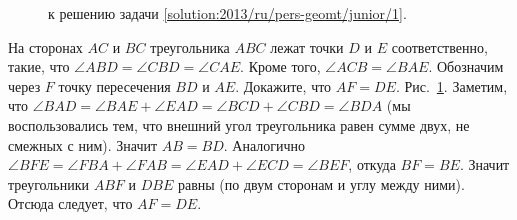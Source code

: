\ifsolution
\begin{figure}\centering
    \caption{к решению задачи \ref{solution:2013/ru/pers-geomt/junior/1}.}
    \label{fig:solution:2013/ru/pers-geomt/junior/1}
\end{figure}%
\fi %

\problem
На сторонах $AC$ и $BC$ треугольника $ABC$ лежат точки $D$ и $E$
соответственно, такие, что $\angle ABD = \angle CBD = \angle CAE$.
Кроме того, $\angle ACB = \angle BAE$.
Обозначим через $F$ точку пересечения $BD$ и $AE$.
Докажите, что $AF = DE$.
\solution
\label{solution:2013/ru/pers-geomt/junior/1}
Рис.~\ref{fig:solution:2013/ru/pers-geomt/junior/1}.
Заметим, что
\(
    \angle BAD = \angle BAE + \angle EAD
=
    \angle BCD + \angle CBD = \angle BDA
\)
(мы воспользовались тем, что внешний угол треугольника равен сумме двух, не
смежных с ним).
Значит $AB = BD$.
Аналогично
\(
    \angle BFE = \angle FBA + \angle FAB
=
    \angle EAD + \angle ECD = \angle BEF
\), откуда $BF=BE$.
Значит треугольники $ABF$ и $DBE$ равны (по двум сторонам и углу между ними).
Отсюда следует, что $AF = DE$.
\endproblem
